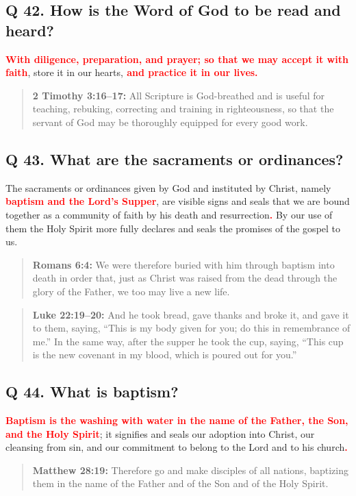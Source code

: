 \documentclass[titlepage]{memoir}
\newcommand\Children[1]{\textbf{\textcolor{red}{#1}}}
\newcommand\Quote[2]{\begin{quote}{\small\textbf{#1:}{ #2}}\end{quote}}
\begin{document}
\subsection{Q 42. How is the Word of God to be read and heard?}
\Children{With diligence, preparation, and prayer; so that we may accept it with faith}, store it in our hearts,\Children{ and practice it in our lives.}

\Quote{2 Timothy 3:16--17}{All Scripture is God-breathed and is useful for teaching, rebuking, correcting and training in righteousness, so that the servant of God may be thoroughly equipped for every good work.}

\subsection{Q 43. What are the sacraments or ordinances?}
The sacraments or ordinances given by God and instituted by Christ, namely \Children{baptism and the Lord's Supper}, are visible signs and seals that we are bound together as a community of faith by his death and resurrection\Children{.} By our use of them the Holy Spirit more fully declares and seals the promises of the gospel to us.

\Quote{Romans 6:4}{We were therefore buried with him through baptism into death in order that, just as Christ was raised from the dead through the glory of the Father, we too may live a new life.}

\Quote{Luke 22:19--20}{And he took bread, gave thanks and broke it, and gave it to them, saying, ``This is my body given for you; do this in remembrance of me.'' In the same way, after the supper he took the cup, saying, ``This cup is the new covenant in my blood, which is poured out for you.''}

\subsection{Q 44. What is baptism?}
\Children{Baptism is the washing with water in the name of the Father, the Son, and the Holy Spirit}; it signifies and seals our adoption into Christ, our cleansing from sin, and our commitment to belong to the Lord and to his church\Children{.}

\Quote{Matthew 28:19}{Therefore go and make disciples of all nations, baptizing them in the name of the Father and of the Son and of the Holy Spirit.}
\end{document}
